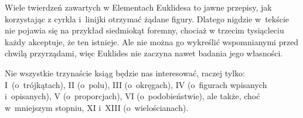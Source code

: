 Wiele twierdzeń zawartych w Elementach Euklidesa to jawne przepisy, jak korzystając z cyrkla i~linijki otrzymać żądane figury.
Dlatego nigdzie w~tekście nie pojawia się na przykład siedmiokąt foremny, chociaż w trzecim tysiącleciu każdy akceptuje, że ten istnieje.
Ale nie można go wykreślić wspomnianymi przed chwilą przyrządami, więc Euklides nie zaczyna nawet badania jego własności.

Nie wszystkie trzynaście ksiąg będzie nas interesować, raczej tylko: I~(o~trójkątach), II (o~polu), III (o~okręgach), IV (o~figurach wpisanych i~opisanych), V (o~proporcjach), VI (o~podobieństwie), ale także, choć w~mniejszym stopniu, XI i~XIII (o~wielościanach).








%